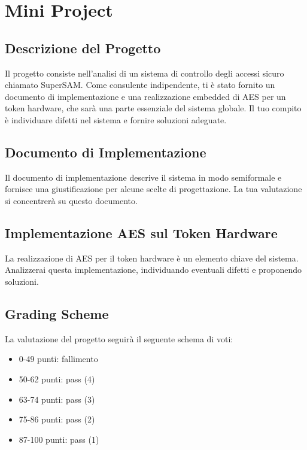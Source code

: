 \documentclass[11pt]{article}
\theoremstyle{definition} \newtheorem{definizione}{Definizione}[section] %
\begin{document}
    \section{Mini Project}
        \subsection*{Descrizione del Progetto}
        Il progetto consiste nell'analisi di un sistema di controllo degli accessi sicuro chiamato SuperSAM. Come consulente indipendente, ti è stato fornito un documento di implementazione e una realizzazione embedded di AES per un token hardware, che sarà una parte essenziale del sistema globale. Il tuo compito è individuare difetti nel sistema e fornire soluzioni adeguate.

        \subsection*{Documento di Implementazione}
        Il documento di implementazione descrive il sistema in modo semiformale e fornisce una giustificazione per alcune scelte di progettazione. La tua valutazione si concentrerà su questo documento.

        \subsection*{Implementazione AES sul Token Hardware}
        La realizzazione di AES per il token hardware è un elemento chiave del sistema. Analizzerai questa implementazione, individuando eventuali difetti e proponendo soluzioni.

        \subsection*{Grading Scheme}
        La valutazione del progetto seguirà il seguente schema di voti:

        \begin{itemize}
        \item 0-49 punti: fallimento
        \item 50-62 punti: pass (4)
        \item 63-74 punti: pass (3)
        \item 75-86 punti: pass (2)
        \item 87-100 punti: pass (1)
        \end{itemize}
        
\end{document}
